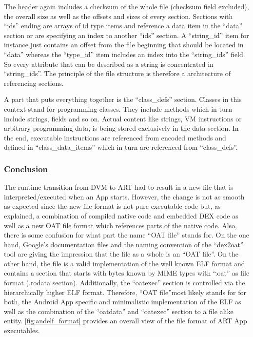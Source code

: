 The header again includes a checksum of the whole file (checksum
field excluded), the overall size as well as the offsets and sizes
of every section. Sections with ``ids'' ending are arrays of
id type items and reference
a data item in the ``data'' section or are specifying
an index to another ``ids'' section. A ``string\_id'' item for
instance just contains an offset from the file beginning
that should be located in ``data'' whereas the ``type\_id'' item
includes an index into the ``string\_ids'' field. So every
attribute that can be described as a string is concentrated in
``string\_ids''. The principle of the file structure is therefore a architecture of referencing
sections.

A part that puts everything together is the ``class\_defs''
section. Classes in this context stand for programming classes. They include methods which in turn include strings, fields and so on. Actual content like
strings, VM instructions or arbitrary programming data, is being stored exclusively in the data section. In the end, executable instructions are referenced from encoded methods and defined in ``class\_data\_items'' which in turn are referenced from ``class\_defs''.


\subsubsection{Conclusion}\label{section:andelf_format_conclusion}
The runtime transition from DVM to ART had to result
in a new file that is interpreted/executed when an App starts.
However, the change is not as smooth as expected since
the new file format is not pure executable code but, as
explained, a combination of compiled native code
and embedded DEX code as well as a new OAT file format
which references parts of the native code. Also, there is some
confusion for what part the name ``OAT file'' stands for. On the
one hand, Google's documentation files and the naming
convention of the ``dex2oat'' tool are giving the impression
that the file as a whole is an ``OAT file''. On
the other hand, the file is a valid implementation of the
well known ELF format and contains a section that starts
with bytes known by MIME types with ``.oat'' as file format
(.rodata section). Additionally, the ``oatexec'' section
is controlled via the hierarchically higher ELF format. Therefore, ``OAT file''most likely stands for for both, the
Android App specific and minimalistic implementation of the ELF
as well as the combination of the ``oatdata'' and ``oatexec''
section to a file alike entity. \autoref{fig:andelf_format}
provides an overall view of the file format of ART App executables.

